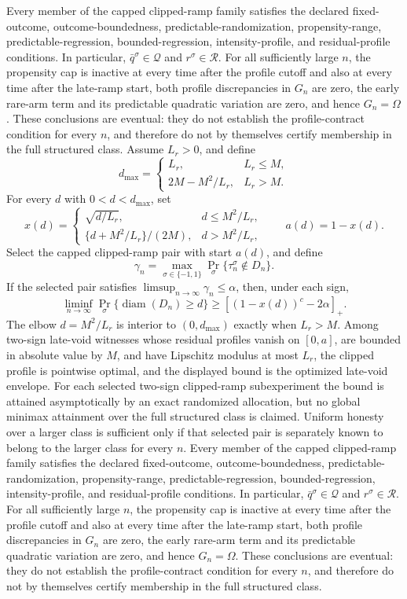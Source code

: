 Every member of the capped clipped-ramp family satisfies the declared fixed-outcome, outcome-boundedness, predictable-randomization, propensity-range, predictable-regression, bounded-regression, intensity-profile, and residual-profile conditions. In particular, \(\bar q^\sigma\in\mathcal Q\) and \(r^\sigma\in\mathcal R\). For all sufficiently large \(n\), the propensity cap is inactive at every time after the profile cutoff and also at every time after the late-ramp start, both profile discrepancies in \(G_n\) are zero, the early rare-arm term and its predictable quadratic variation are zero, and hence \(G_n=\Omega\). These conclusions are eventual: they do not establish the profile-contract condition for every \(n\), and therefore do not by themselves certify membership in the full structured class.
Assume \(L_r>0\), and define
\[
 d_{\max}=\begin{cases}
 L_r,&L_r\le M,\\
 2M-M^2/L_r,&L_r>M.
 \end{cases}
\]
For every \(d\) with \(0<d<d_{\max}\), set
\[
 x(d)=\begin{cases}
 \sqrt{d/L_r},&d\le M^2/L_r,\\
 \{d+M^2/L_r\}/(2M),&d>M^2/L_r,
 \end{cases}
 \qquad a(d)=1-x(d).
\]
Select the capped clipped-ramp pair with start \(a(d)\), and define
\[
 \gamma_n=\max_{\sigma\in\{-1,1\}}
 \Pr_\sigma\{\tau_n^\sigma\notin D_n\}.
\]
If the selected pair satisfies \(\limsup_{n\to\infty}\gamma_n\le\alpha\), then, under each sign,
\[
 \liminf_{n\to\infty}
 \Pr_\sigma\{\operatorname{diam}(D_n)\ge d\}
 \ge[(1-x(d))^c-2\alpha]_+.
\]
The elbow \(d=M^2/L_r\) is interior to \((0,d_{\max})\) exactly when \(L_r>M\). Among two-sign late-void witnesses whose residual profiles vanish on \([0,a]\), are bounded in absolute value by \(M\), and have Lipschitz modulus at most \(L_r\), the clipped profile is pointwise optimal, and the displayed bound is the optimized late-void envelope. For each selected two-sign clipped-ramp subexperiment the bound is attained asymptotically by an exact randomized allocation, but no global minimax attainment over the full structured class is claimed. Uniform honesty over a larger class is sufficient only if that selected pair is separately known to belong to the larger class for every \(n\).
Every member of the capped clipped-ramp family satisfies the declared fixed-outcome, outcome-boundedness, predictable-randomization, propensity-range, predictable-regression, bounded-regression, intensity-profile, and residual-profile conditions. In particular, \(\bar q^\sigma\in\mathcal Q\) and \(r^\sigma\in\mathcal R\). For all sufficiently large \(n\), the propensity cap is inactive at every time after the profile cutoff and also at every time after the late-ramp start, both profile discrepancies in \(G_n\) are zero, the early rare-arm term and its predictable quadratic variation are zero, and hence \(G_n=\Omega\). These conclusions are eventual: they do not establish the profile-contract condition for every \(n\), and therefore do not by themselves certify membership in the full structured class.
